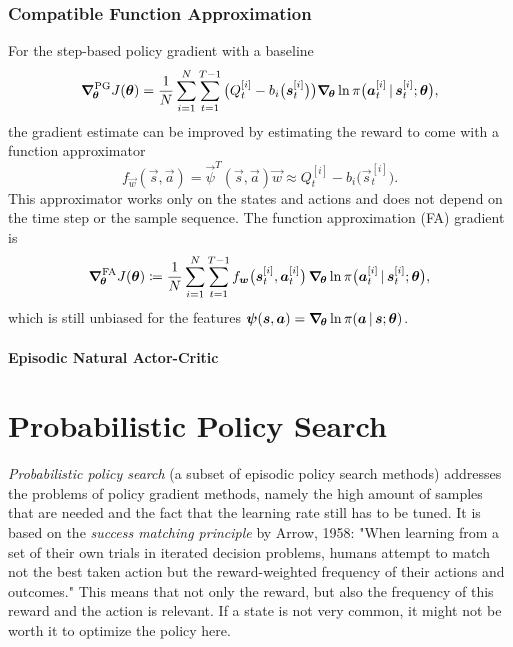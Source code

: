 			\subsubsection{Compatible Function Approximation} %
				\label{subsubsec:compatibleFunctionApproximation}

				For the step-based policy gradient with a baseline
				\begin{equation*}
					\grad_{\!\bm{\theta}}^\mathrm{PG} J(\bm{\theta})
						= \frac{1}{N} \sum_{i = 1}^{N} \sum_{t = 1}^{T - 1} \big(Q_t^{[i]} - b_i\big(\bm{s}_t^{[i]}\big)\big) \grad_{\!\bm{\theta}} \ln \pi\big(\bm{a}_t^{[i]} \,\vert\, \bm{s}_t^{[i]}; \bm{\theta}\big),
				\end{equation*}
				the gradient estimate can be improved by estimating the reward to come with a function approximator
				\begin{equation*}
					f_{\vec{w}}(\vec{s}, \vec{a}) = \vec{\psi}^T(\vec{s}, \vec{a}) \vec{w} \approx Q_t^{[i]} - b_i\big(\vec{s}_t^{[i]}\big).
				\end{equation*}
				This approximator works only on the states and actions and does not depend on the time step or the sample sequence. The function approximation (FA) gradient is
				\begin{equation*}
					\grad_{\!\bm{\theta}}^\mathrm{FA} J(\bm{\theta})
						\coloneqq \frac{1}{N} \sum_{i = 1}^{N} \sum_{t = 1}^{T - 1} f_{\bm{w}}\big( \bm{s}_t^{[i]}, \bm{a}_t^{[i]} \big) \, \grad_{\!\bm{\theta}} \ln \pi\big(\bm{a}_t^{[i]} \,\vert\, \bm{s}_t^{[i]}; \bm{\theta}\big),
				\end{equation*}
				which is still unbiased for the features \( \bm{\psi}(\bm{s}, \bm{a}) = \grad_{\!\bm{\theta}} \ln \pi(\bm{a} \,\vert\, \bm{s}; \bm{\theta}) \).


				\paragraph{Episodic Natural Actor-Critic} %

	\section{Probabilistic Policy Search}
		\emph{Probabilistic policy search} (a subset of episodic policy search methods) addresses the problems of policy gradient methods, namely the high amount of samples that are needed and the fact that the learning rate still has to be tuned. It is based on the \emph{success matching principle} by Arrow, 1958: "When learning from a set of their own trials in iterated decision problems, humans attempt to match not the best taken action but the reward-weighted frequency of their actions and outcomes." This means that not only the reward, but also the frequency of this reward and the action is relevant. If a state is not very common, it might not be worth it to optimize the policy here.

